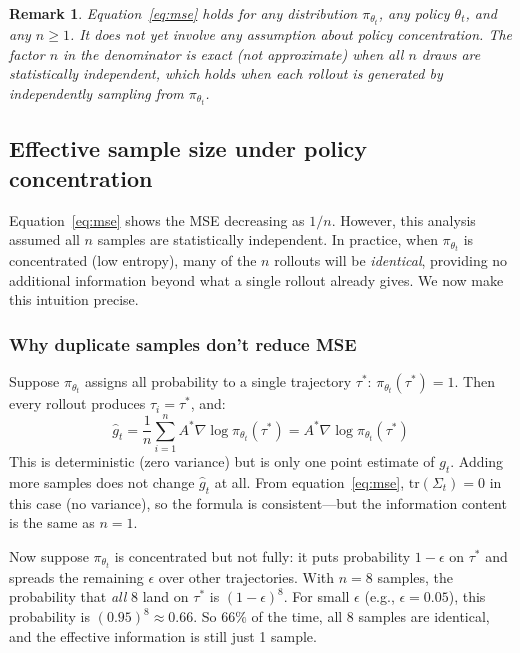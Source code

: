 \documentclass[11pt,a4paper]{article}
\newcommand{\ghat}{\hat{g}_t}
\newcommand{\pith}{\pi_{\theta_t}}
\newtheorem{remark}{Remark}
\begin{document}
\begin{remark}
  Equation~\eqref{eq:mse} holds for any distribution $\pith$, any policy $\theta_t$,
  and any $n \geq 1$.
  It does not yet involve any assumption about policy concentration.
  The factor $n$ in the denominator is exact (not approximate) when all $n$ draws are statistically independent,
  which holds when each rollout is generated by independently sampling from $\pith$.
\end{remark}

\subsection{Effective sample size under policy concentration}
\label{sec:neff}

Equation~\eqref{eq:mse} shows the MSE decreasing as $1/n$.
However, this analysis assumed all $n$ samples are statistically independent.
In practice, when $\pith$ is concentrated (low entropy), many of the $n$ rollouts will be
\emph{identical}, providing no additional information beyond what a single rollout already gives.
We now make this intuition precise.

\subsubsection{Why duplicate samples don't reduce MSE}

Suppose $\pith$ assigns all probability to a single trajectory $\tau^*$: $\pith(\tau^*) = 1$.
Then every rollout produces $\tau_i = \tau^*$, and:
\begin{equation}
  \ghat = \frac{1}{n}\sum_{i=1}^n A^*\nabla\log\pith(\tau^*)
        = A^*\nabla\log\pith(\tau^*)
\end{equation}
This is deterministic (zero variance) but is only one point estimate of $g_t$.
Adding more samples does not change $\ghat$ at all.
From equation~\eqref{eq:mse}, $\mathrm{tr}(\Sigma_t) = 0$ in this case (no variance), so the formula is consistent—but the information content is the same as $n=1$.

Now suppose $\pith$ is concentrated but not fully: it puts probability $1-\epsilon$ on $\tau^*$ and spreads the remaining $\epsilon$ over other trajectories.
With $n=8$ samples, the probability that \emph{all} 8 land on $\tau^*$ is $(1-\epsilon)^8$.
For small $\epsilon$ (e.g., $\epsilon = 0.05$), this probability is $(0.95)^8 \approx 0.66$.
So $66\%$ of the time, all 8 samples are identical, and the effective information is still just 1 sample.
\end{document}

